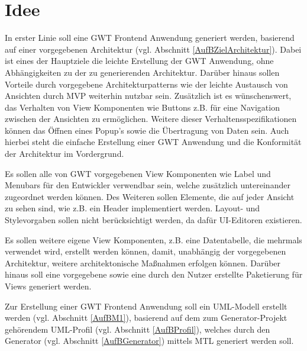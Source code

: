 \chapter{Idee}
\label{Idee}
In erster Linie soll eine GWT Frontend Anwendung generiert werden, basierend auf
einer vorgegebenen Architektur (vgl. Abschnitt \ref{AufBZielArchitektur}). Dabei
ist eines der Hauptziele die leichte Erstellung der GWT Anwendung, ohne
Abhängigkeiten zu der zu generierenden Architektur. Darüber hinaus sollen
Vorteile durch vorgegebene Architekturpatterns wie der leichte Austausch von
Ansichten durch MVP weiterhin nutzbar sein. Zusätzlich ist es wünschenswert, das
Verhalten von View Komponenten wie Buttons z.B. für eine Navigation zwischen
der Ansichten zu ermöglichen. Weitere dieser Verhaltensspezifikationen können
das Öffnen eines Popup's sowie die Übertragung von Daten sein. Auch hierbei
steht die einfache Erstellung einer GWT Anwendung und die Konformität
der Architektur im Vordergrund.

Es sollen alle von GWT vorgegebenen View Komponenten wie Label und
Menubars für den Entwickler verwendbar sein, welche zusätzlich
untereinander zugeordnet werden können. Des Weiteren sollen Elemente, die auf
jeder Ansicht zu sehen sind, wie z.B. ein Header implementiert werden. Layout-
und Stylevorgaben sollen nicht berücksichtigt werden, da dafür UI-Editoren
existieren.

Es sollen weitere eigene View Komponenten, z.B. eine Datentabelle, die mehrmals
verwendet wird, erstellt werden können, damit, unabhängig der vorgegebenen
Architektur, weitere architektonische Maßnahmen erfolgen können. Darüber hinaus soll
eine vorgegebene sowie eine durch den Nutzer erstellte Paketierung
für Views generiert werden.

Zur Erstellung einer GWT Frontend Anwendung soll ein UML-Modell
erstellt werden (vgl. Abschnitt \ref{AufBM1}), basierend auf dem zum
Generator-Projekt gehörendem UML-Profil (vgl. Abschnitt \ref{AufBProfil}),
welches durch den Generator (vgl. Abschnitt \ref{AufBGenerator}) mittels
MTL generiert werden soll.

